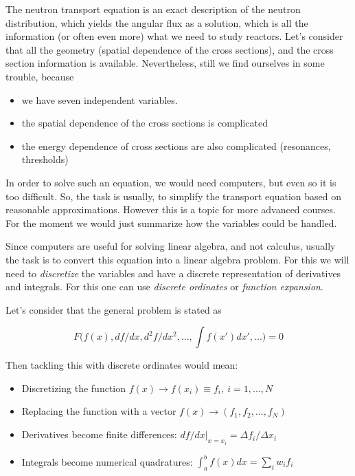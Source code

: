 The neutron transport equation is an exact description of the neutron distribution, which yields the angular flux as a solution, which is all the information (or often even more) what we need to study reactors. Let's consider that all the geometry (spatial dependence of the cross sections), and the cross section information is available. Nevertheless, still we find ourselves in some trouble, because

\begin{itemize}
\item we have seven independent variables.
\item the spatial dependence of the cross sections is complicated
\item the energy dependence of cross sections are also complicated (resonances, thresholds)
\end{itemize}

In order to solve such an equation, we would need computers, but even so it is too difficult. So, the task is usually, to simplify the transport equation based on reasonable approximations. However this is a topic for more advanced courses. For the moment we would just summarize how the variables could be handled.

Since computers are useful for solving linear algebra, and not calculus, usually the task is to convert this equation into a linear algebra problem. For this we will need to \textit{discretize} the variables and have a discrete representation of derivatives and integrals. For this one can use \textit{discrete ordinates} or \textit{function expansion}.

Let's consider that the general problem is stated as

\begin{equation}
F\Big(f(x),df/dx,d^2f/dx^2,...,\int f(x')dx',...\Big)=0
\end{equation}

\noindent Then tackling this with discrete ordinates would mean:

\begin{itemize}
\item Discretizing the function  $f(x)\rightarrow f(x_i)\equiv f_i, \: i=1,...,N$
\item Replacing the function with a vector $f(x)\rightarrow (f_1,f_2,...,f_N)$
\item Derivatives become finite differences: $df/dx|_{x=x_i}=\Delta f_i/\Delta x_i$
\item Integrals become numerical quadratures: $\int_a^bf(x)dx=\sum_iw_if_i$
\end{itemize} 

